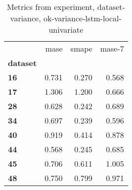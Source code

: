 \begin{table}[h]
\centering
\caption{Metrics from experiment, dataset-variance, ok-variance-lstm-local-univariate}
\label{table:ok-variance-lstm-local-univariate-dataset-variance}
\begin{tabular}{lrrr}
\toprule
{} &   mase &  smape &  mase-7 \\
\textbf{dataset} &        &        &         \\
\midrule
\textbf{16     } &  0.731 &  0.270 &   0.568 \\
\textbf{17     } &  1.306 &  1.200 &   0.666 \\
\textbf{28     } &  0.628 &  0.242 &   0.689 \\
\textbf{34     } &  0.697 &  0.239 &   0.596 \\
\textbf{40     } &  0.919 &  0.414 &   0.878 \\
\textbf{44     } &  0.568 &  0.245 &   0.685 \\
\textbf{45     } &  0.706 &  0.611 &   1.005 \\
\textbf{48     } &  0.750 &  0.799 &   0.971 \\
\bottomrule
\end{tabular}
\end{table}
